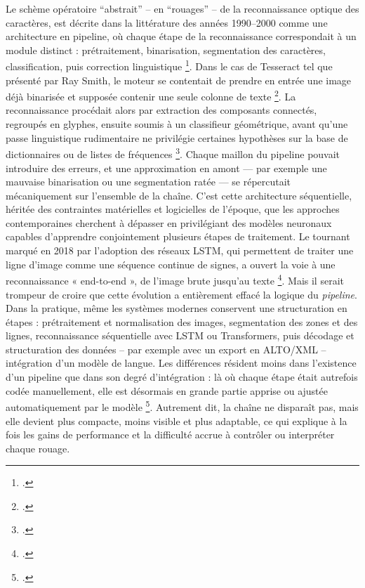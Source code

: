 Le schème opératoire \enquote{abstrait} -- en \enquote{rouages} -- de la reconnaissance optique des caractères, est décrite dans la littérature des années 1990–2000 comme une architecture en pipeline, où chaque étape de la reconnaissance correspondait à un module distinct : prétraitement, binarisation, segmentation des caractères, classification, puis correction linguistique \footcite[][]{lecolinet}. Dans le cas de Tesseract tel que présenté par Ray Smith, le moteur se contentait de prendre en entrée une image déjà binarisée et supposée contenir une seule colonne de texte \footcite[][]{smith}. La reconnaissance procédait alors par extraction des composants connectés, regroupés en glyphes, ensuite soumis à un classifieur géométrique, avant qu’une passe linguistique rudimentaire ne privilégie certaines hypothèses sur la base de dictionnaires ou de listes de fréquences \footcite[][]{smith2013}. Chaque maillon du pipeline pouvait introduire des erreurs, et une approximation en amont — par exemple une mauvaise binarisation ou une segmentation ratée — se répercutait mécaniquement sur l’ensemble de la chaîne. C’est cette architecture séquentielle, héritée des contraintes matérielles et logicielles de l’époque, que les approches contemporaines cherchent à dépasser en privilégiant des modèles neuronaux capables d’apprendre conjointement plusieurs étapes de traitement. Le tournant marqué en 2018 par l’adoption des réseaux LSTM, qui permettent de traiter une ligne d’image comme une séquence continue de signes, a ouvert la voie à une reconnaissance « end-to-end », de l’image brute jusqu’au texte \footcite[][]{smith}. Mais il serait trompeur de croire que cette évolution a entièrement effacé la logique du \emph{pipeline}. Dans la pratique, même les systèmes modernes conservent une structuration en étapes : prétraitement et normalisation des images, segmentation des zones et des lignes, reconnaissance séquentielle avec LSTM ou Transformers, puis décodage et structuration des données -- par exemple avec un export en ALTO/XML -- intégration d’un modèle de langue. Les différences résident moins dans l’existence d’un pipeline que dans son degré d’intégration : là où chaque étape était autrefois codée manuellement, elle est désormais en grande partie apprise ou ajustée automatiquement par le modèle \footcite[][]{kraken}. Autrement dit, la chaîne ne disparaît pas, mais elle devient plus compacte, moins visible et plus adaptable, ce qui explique à la fois les gains de performance et la difficulté accrue à contrôler ou interpréter chaque rouage.

